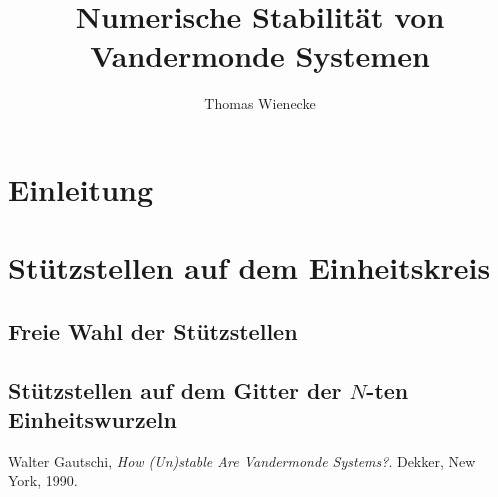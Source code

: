 \documentclass[a4paper, 11pt]{scrreprt}
\title{Numerische Stabilität von Vandermonde Systemen}
\author{Thomas Wienecke}
\begin{document}
\maketitle
\tableofcontents

\chapter{Einleitung}

%





\chapter{Stützstellen auf dem Einheitskreis}
\section{Freie Wahl der Stützstellen}
\section{Stützstellen auf dem Gitter der $N$-ten Einheitswurzeln}

\begin{thebibliography}{9}
    Walter Gautschi,
    \emph{How (Un)stable Are Vandermonde Systems?}.
    Dekker, New York,
    1990.
\end{thebibliography}
\end{document}
